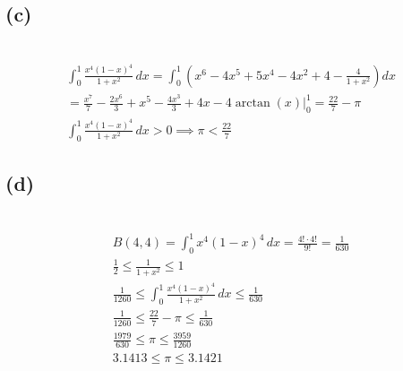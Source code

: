 \documentclass[12pt]{article}
\newcommand{\subproblem}[1]{\subsection{(#1)} \,}
\begin{document}
\subproblem{c}
\begin{gather*}
    \int_0^1 \frac{x^4(1-x)^4}{1+x^2} \, dx = \int_0^1 \left( x^6 - 4x^5 + 5x^4 - 4x^2 + 4 - \frac{4}{1+x^2} \right) dx\\
    =\frac{x^7}{7} - \frac{2x^6}{3} + x^5 - \frac{4x^3}{3} + 4x - 4\arctan(x)\Big|^1_0=\boxed{\frac{22}{7}-\pi}\\
    \int_0^1 \frac{x^4(1-x)^4}{1+x^2} \, dx > 0 \implies \boxed{\pi < \frac{22}{7}}
\end{gather*}

\subproblem{d}
\begin{gather*}
    B(4,4)=\int_0^1 x^4(1-x)^4 \, dx = \frac{4!\cdot 4!}{9!} = \frac{1}{630}\\
    \frac{1}{2}\le \frac{1}{1+x^2} \le 1  \\
    \frac{1}{1260} \le \int_0^1 \frac{x^4(1-x)^4}{1+x^2} \, dx \le \frac{1}{630}\\
    \frac{1}{1260} \le \frac{22}{7} - \pi \le \frac{1}{630}\\
    \frac{1979}{630} \le \pi \le \frac{3959}{1260}\\
    \boxed{3.1413 \le \pi \le 3.1421}
\end{gather*}
\end{document}
